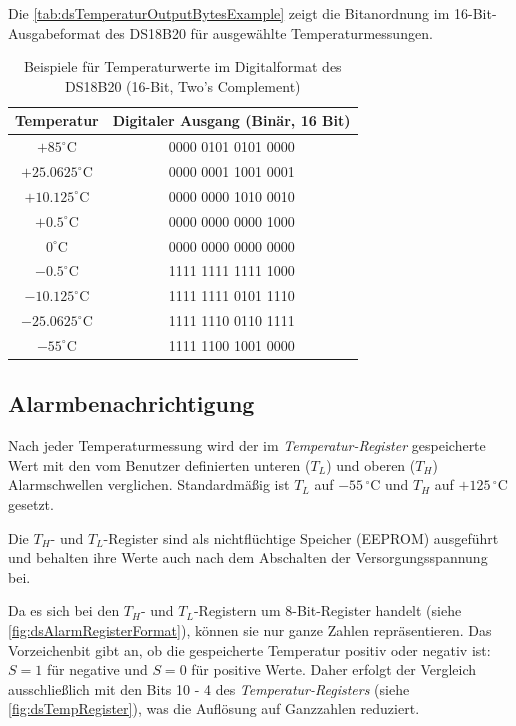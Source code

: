 	Die \autoref{tab:dsTemperaturOutputBytesExample} zeigt die Bitanordnung im 16-Bit-Ausgabeformat des DS18B20 für ausgewählte Temperaturmessungen.
	
	\begin{table}[H]
		\centering
		\begin{tabular}{|c|c|}
			\hline
			\textbf{Temperatur} & \textbf{Digitaler Ausgang (Binär, 16 Bit)} \\
			\hline
			$+85^\circ\mathrm{C}$ & 0000 0101 0101 0000 \\
			\hline
			$+25.0625^\circ\mathrm{C}$ & 0000 0001 1001 0001 \\
			\hline
			$+10.125^\circ\mathrm{C}$  & 0000 0000 1010 0010 \\
			\hline
			$+0.5^\circ\mathrm{C}$ & 0000 0000 0000 1000 \\
			\hline
			$0^\circ\mathrm{C}$ & 0000 0000 0000 0000 \\
			\hline
			$-0.5^\circ\mathrm{C}$ & 1111 1111 1111 1000 \\
			\hline
			$-10.125^\circ\mathrm{C}$  & 1111 1111 0101 1110 \\
			\hline
			$-25.0625^\circ\mathrm{C}$ & 1111 1110 0110 1111 \\
			\hline
			$-55^\circ\mathrm{C}$      & 1111 1100 1001 0000 \\
			\hline
		\end{tabular}
		\caption{Beispiele für Temperaturwerte im Digitalformat des DS18B20 (16-Bit, Two's Complement) \cite{Maxim:2019}}
		\label{tab:dsTemperaturOutputBytesExample}
	\end{table}


\subsection{Alarmbenachrichtigung \label{alarmTriggerFeature}}
Nach jeder Temperaturmessung wird der im \textit{Temperatur-Register} gespeicherte Wert mit den vom Benutzer definierten unteren ($T_L$) und oberen ($T_H$) Alarmschwellen verglichen. 
Standardmä{\ss}ig ist $T_L$ auf \(-55\,^\circ\mathrm{C}\) und $T_H$ auf \(+125\,^\circ\mathrm{C}\) gesetzt. 

Die $T_H$- und $T_L$-Register sind als nichtflüchtige Speicher (EEPROM) ausgeführt und behalten ihre Werte auch nach dem Abschalten der Versorgungsspannung bei.

Da es sich bei den $T_H$- und $T_L$-Registern um 8-Bit-Register handelt (siehe \autoref{fig:dsAlarmRegisterFormat}), können sie nur ganze Zahlen repräsentieren. Das Vorzeichenbit gibt an, ob die gespeicherte Temperatur positiv oder negativ ist: $S = 1$ für negative und $S = 0$ für positive Werte. 
Daher erfolgt der Vergleich ausschlie{\ss}lich mit den Bits 10 - 4 des \textit{Temperatur-Registers} (siehe \autoref{fig:dsTempRegister}), was die Auflösung auf Ganzzahlen reduziert.

